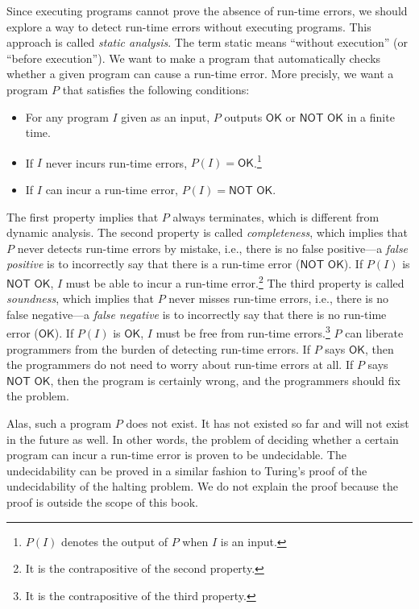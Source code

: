 Since executing programs cannot prove the absence of run-time errors, we should
explore a way to detect run-time errors without executing programs. This
approach is called \textit{static analysis}. The term
static means ``without execution'' (or ``before execution''). We want to make
a program that automatically checks whether a given program can cause a run-time
error.
More precisly, we want a program $P$ that satisfies the following conditions:
\begin{itemize}
  \item For any program $I$ given as an input, $P$ outputs $\textsf{OK}$ or
    $\textsf{NOT OK}$ in a finite time.
  \item If $I$ never incurs run-time errors,
    $P(I)=\textsf{OK}$.\footnote{$P(I)$ denotes the output of $P$ when $I$ is
    an input.}
  \item If $I$ can incur a run-time error, $P(I)=\textsf{NOT OK}$.
\end{itemize}
The first property implies that $P$ always terminates, which is different from
dynamic analysis.
The second property is called \textit{completeness},
which implies that $P$ never detects run-time errors by mistake, i.e., there is
no false positive---a \textit{false positive}
is to incorrectly say that there is a run-time error ($\textsf{NOT OK}$).
If $P(I)$ is $\textsf{NOT OK}$, $I$ must be able to incur a run-time
error.\footnote{It is the contrapositive of the second property.}
The third property is called \textit{soundness},
which implies that $P$ never misses run-time errors, i.e., there is no false
negative---a \textit{false negative}
is to incorrectly say that there is no run-time error ($\textsf{OK}$).
If $P(I)$ is $\textsf{OK}$, $I$ must be free from run-time
errors.\footnote{It is the contrapositive of the third property.}
$P$ can liberate programmers from the burden of detecting run-time errors.
If $P$ says $\textsf{OK}$, then the programmers do not need to worry about run-time
errors at all. If $P$ says $\textsf{NOT OK}$, then the program is certainly wrong, and
the programmers should fix the problem.

Alas, such a program $P$ does not exist. It has not existed so far and will
not exist in the future as well. In other words, the problem of deciding whether
a certain program can incur a run-time error is proven to be undecidable. The
undecidability can be proved in a similar fashion to Turing's proof of the
undecidability of the halting problem. We do not explain the proof because the proof
is outside the scope of this book.

